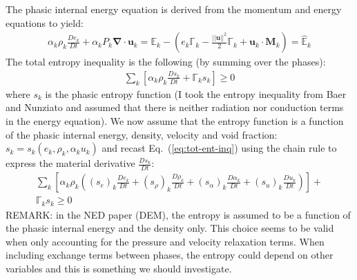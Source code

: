 \documentclass[preprint,10pt]{elsarticle}
\renewcommand{\div}{\mbold{\nabla}\! \cdot \!}
\newcommand{\mbold}[1]{\boldsymbol#1}
\newcommand{\eqt}[1]{Eq.~(\ref{#1})}                     %
\begin{document}
The phasic internal energy equation is derived from the momentum and energy equations to yield:
%
\begin{multline}\label{eq:int-energy}
\alpha_k \rho_k \frac{D e_k}{Dt} + \alpha_k P_k \div \mbold u_k = \mathbb{E}_k - \left( e_k \mathbb{\Gamma}_k - \frac{|| \mbold u ||^2}{2} \mathbb{\Gamma}_k + \mbold u_k \cdot \mathbb{\mbold M}_k  \right) = \mathbb{\hat{E}}_k
\end{multline}
%
The total entropy inequality is the following (by summing over the phases):
%
\begin{align}\label{eq:tot-ent-inq}
\sum_k \left[ \alpha_k \rho_k \frac{D s_k}{Dt} + \mathbb{\Gamma}_k s_k \right] \geq 0
\end{align}
%
where $s_k$ is the phasic entropy function (I took the entropy inequality from Baer and Nunziato and assumed that there is neither radiation nor conduction terms in the energy equation). We now assume that the entropy function is a function of the phasic internal energy, density, velocity and void fraction: $s_k = s_k(e_k, \rho_k, \alpha_k u_k)$ and recast \eqt{eq:tot-ent-inq} using the chain rule to express the material derivative $\frac{D s_k}{Dt}$:
%
\begin{multline}\label{eq:tot-ent-inq2}
\sum_k \left[ \alpha_k \rho_k \left( (s_e)_k \frac{D e_k}{Dt} + (s_\rho)_k \frac{D \rho_k}{Dt} + (s_\alpha)_k \frac{D \alpha_k}{Dt} + (s_u)_k \frac{D u_k}{Dt} \right) \right] + \\\mathbb{\Gamma}_k s_k \geq 0
\end{multline}
%
REMARK: in the NED paper (DEM), the entropy is assumed to be a function of the phasic internal energy and the density only. This choice seems to be valid when only accounting for the pressure and velocity relaxation terms. When including exchange terms between phases, the entropy could depend on other variables and this is something we should investigate.
\end{document}
